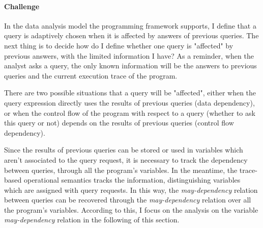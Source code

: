 \paragraph{Challenge}
\label{para:exe-dep-challenge}
In the data analysis model the programming framework supports, 
  I define that a query is adaptively chosen when it is affected by answers of previous queries. The next thing is to decide how do I define whether one query is "affected" by previous answers, with the limited information I have? As a reminder, 
 when the analyst asks a query, the only known information will be the answers to previous queries and the current execution trace of the program.


There are two possible situations that a query will be "affected",  
either when the query expression directly uses the results of previous queries (data dependency), or when the control flow of the program with respect to a query (whether to ask this query or not) depends on the results of previous queries (control flow dependency).


Since the results of previous queries can be stored or used in variables
which aren't associated to the query request,
it is necessary to track the dependency between queries, through all the program's variables.
In the meantime, the trace-based operational semantics tracks the information,
distinguishing variables which are assigned with query requests.
In this way, the \emph{may-dependency} relation between queries can be recovered through 
the \emph{may-dependency} relation over all the program's variables.
According to this, I focus on the analysis on the variable \emph{may-dependency} relation in the following of this section.

